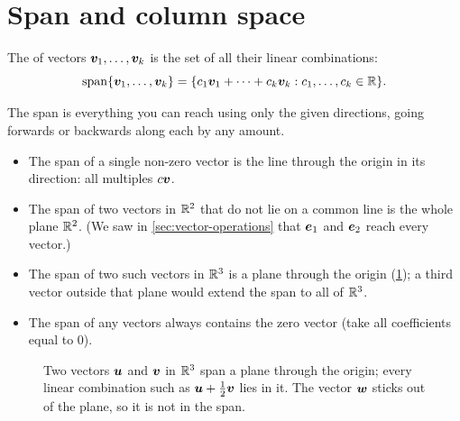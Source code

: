 \section{Span and column space}\label{sec:span}

\begin{definition}[Span]\label{def:span}
The  of vectors $\bm{v}_1, \dots, \bm{v}_k$ is the set of all their linear
combinations:
\[
  \operatorname{span}\{\bm{v}_1, \dots, \bm{v}_k\} = \{c_1\bm{v}_1 + \dots + c_k\bm{v}_k :
  c_1, \dots, c_k \in \mathbb{R}\}.
\]
\end{definition}

The span is everything you can reach using only the given directions, going
forwards or backwards along each by any amount.

\begin{itemize}
  \item The span of a single non-zero vector is the line through the origin
    in its direction: all multiples $c\bm{v}$.
  \item The span of two vectors in $\mathbb{R}^2$ that do not lie on a common line is
    the whole plane $\mathbb{R}^2$. (We saw in \cref{sec:vector-operations} that
    $\bm{e}_1$ and $\bm{e}_2$ reach every vector.)
  \item The span of two such vectors in $\mathbb{R}^3$ is a plane through the origin
    (\cref{fig:span-plane}); a third vector outside that plane would extend the
    span to all of $\mathbb{R}^3$.
  \item The span of any vectors always contains the zero vector (take all
    coefficients equal to $0$).
\end{itemize}

\begin{figure}[htbp]
\centering
{}
\caption{Two vectors $\bm{u}$ and $\bm{v}$ in $\mathbb{R}^3$ span a plane through the
  origin; every linear combination such as $\bm{u} + \frac12\bm{v}$ lies in it. The
  vector $\bm{w}$ sticks out of the plane, so it is not in the span.}
\label{fig:span-plane}
\end{figure}


